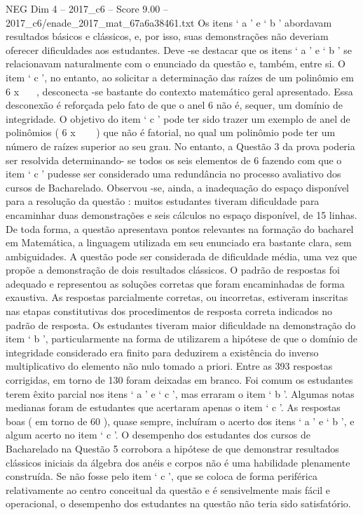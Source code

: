 \begin{textsample}{NEG Dim 4 – 2017\_c6 – Score 9.00 – 2017\_c6/enade\_2017\_mat\_67a6a38461.txt}
Os itens ‘ a ’ e ‘ b ’ abordavam resultados básicos e clássicos, e, por isso, suas demonstrações não deveriam oferecer dificuldades aos estudantes.
Deve -se destacar que os itens ‘ a ’ e ‘ b ’ se relacionavam naturalmente com o enunciado da questão e, também, entre si.
O item ‘ c ’, no entanto, ao solicitar a determinação das raízes de um polinômio em 6 x  , desconecta -se bastante do contexto matemático geral apresentado.
Essa desconexão é reforçada pelo fato de que o anel 6 não é, sequer, um domínio de integridade.
O objetivo do item ‘ c ’ pode ter sido trazer um exemplo de anel de polinômios ( 6 x   ) que não é fatorial, no qual um polinômio pode ter um número de raízes superior ao seu grau.
No entanto, a Questão 3 da prova poderia ser resolvida determinando- se todos os seis elementos de 6 fazendo com que o item ‘ c ’ pudesse ser considerado uma redundância no processo avaliativo dos cursos de Bacharelado.
Observou -se, ainda, a inadequação do espaço disponível para a resolução da questão : muitos estudantes tiveram dificuldade para encaminhar duas demonstrações e seis cálculos no espaço disponível, de 15 linhas.
De toda forma, a questão apresentava pontos relevantes na formação do bacharel em Matemática, a linguagem utilizada em seu enunciado era bastante clara, sem ambiguidades.
A questão pode ser considerada de dificuldade média, uma vez que propõe a demonstração de dois resultados clássicos.
O padrão de respostas foi adequado e representou as soluções corretas que foram encaminhadas de forma exaustiva.
As respostas parcialmente corretas, ou incorretas, estiveram inscritas nas etapas constitutivas dos procedimentos de resposta correta indicados no padrão de resposta.
Os estudantes tiveram maior dificuldade na demonstração do item ‘ b ’, particularmente na forma de utilizarem a hipótese de que o domínio de integridade considerado era finito para deduzirem a existência do inverso multiplicativo do elemento não nulo tomado a priori.
Entre as 393 respostas corrigidas, em torno de 130 foram deixadas em branco.
Foi comum os estudantes terem êxito parcial nos itens ‘ a ’ e ‘ c ’, mas erraram o item ‘ b ’.
Algumas notas medianas foram de estudantes que acertaram apenas o item ‘ c ’.
As respostas boas ( em torno de 60 ), quase sempre, incluíram o acerto dos itens ‘ a ’ e ‘ b ’, e algum acerto no item ‘ c ’.
O desempenho dos estudantes dos cursos de Bacharelado na Questão 5 corrobora a hipótese de que demonstrar resultados clássicos iniciais da álgebra dos anéis e corpos não é uma habilidade plenamente construída.
Se não fosse pelo item ‘ c ’, que se coloca de forma periférica relativamente ao centro conceitual da questão e é sensivelmente mais fácil e operacional, o desempenho dos estudantes na questão não teria sido satisfatório.

\end{textsample}
